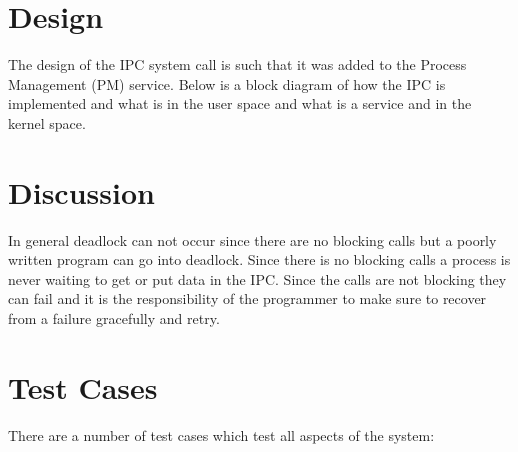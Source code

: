 \documentclass{article}
\begin{document}
\section{Design}
The design of the IPC system call is such that it was added to the Process Management (PM) service. Below is a block diagram of how the IPC is implemented and what is in the user space and what is a service and in the kernel space. 

\begin{figure}[!h]
\end{figure}

\section{Discussion}
In general deadlock can not occur since there are no blocking calls but a poorly written program can go into deadlock. Since there is no blocking calls a process is never waiting to get or put data in the IPC. Since the calls are not blocking they can fail and it is the responsibility of the programmer to make sure to recover from a failure gracefully and retry. 

\section{Test Cases}

There are a number of test cases which test all aspects of the system:
\end{document}
